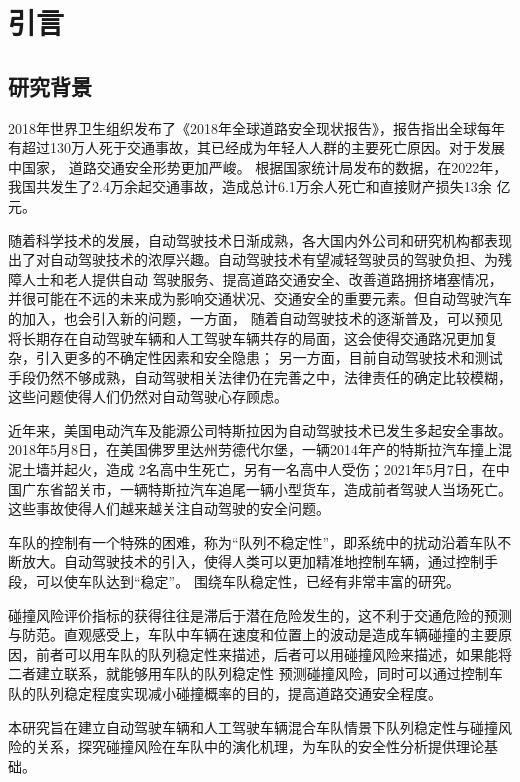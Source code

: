 
\chapter{引言}

\section{研究背景}

2018年世界卫生组织发布了《2018年全球道路安全现状报告》，报告指出全球每年有超过130万人死于交通事故，其已经成为年轻人人群的主要死亡原因。对于发展中国家，
道路交通安全形势更加严峻。\cite{WHO} 根据国家统计局发布的数据，在2022年，我国共发生了2.4万余起交通事故，造成总计6.1万余人死亡和直接财产损失13余
亿元。\cite{stats_gov}

随着科学技术的发展，自动驾驶技术日渐成熟，各大国内外公司和研究机构都表现出了对自动驾驶技术的浓厚兴趣。自动驾驶技术有望减轻驾驶员的驾驶负担、为残障人士和老人提供自动
驾驶服务、提高道路交通安全、改善道路拥挤堵塞情况，并很可能在不远的未来成为影响交通状况、交通安全的重要元素。但自动驾驶汽车的加入，也会引入新的问题，一方面，
随着自动驾驶技术的逐渐普及，可以预见将长期存在自动驾驶车辆和人工驾驶车辆共存的局面，这会使得交通路况更加复杂，引入更多的不确定性因素和安全隐患；
另一方面，目前自动驾驶技术和测试手段仍然不够成熟，自动驾驶相关法律仍在完善之中，法律责任的确定比较模糊，这些问题使得人们仍然对自动驾驶心存顾虑。

近年来，美国电动汽车及能源公司特斯拉因为自动驾驶技术已发生多起安全事故。2018年5月8日，在美国佛罗里达州劳德代尔堡，一辆2014年产的特斯拉汽车撞上混泥土墙并起火，造成
2名高中生死亡，另有一名高中人受伤；2021年5月7日，在中国广东省韶关市，一辆特斯拉汽车追尾一辆小型货车，造成前者驾驶人当场死亡。这些事故使得人们越来越关注自动驾驶的安全问题。

车队的控制有一个特殊的困难，称为“队列不稳定性”\cite{FENG201981}，即系统中的扰动沿着车队不断放大。自动驾驶技术的引入，使得人类可以更加精准地控制车辆，通过控制手段，可以使车队达到“稳定”。
围绕车队稳定性，已经有非常丰富的研究。

碰撞风险评价指标的获得往往是滞后于潜在危险发生的，这不利于交通危险的预测与防范。直观感受上，车队中车辆在速度和位置上的波动是造成车辆碰撞的主要原因，前者可以用车队的队列稳定性来描述，后者可以用碰撞风险来描述，如果能将二者建立联系，就能够用车队的队列稳定性
预测碰撞风险，同时可以通过控制车队的队列稳定程度实现减小碰撞概率的目的，提高道路交通安全程度。

本研究旨在建立自动驾驶车辆和人工驾驶车辆混合车队情景下队列稳定性与碰撞风险的关系，探究碰撞风险在车队中的演化机理，为车队的安全性分析提供理论基础。




